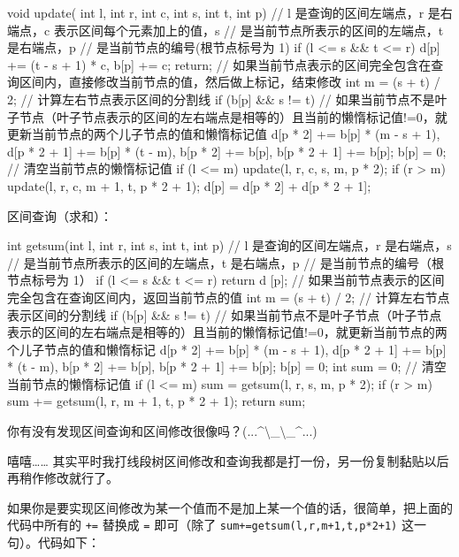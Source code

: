 \begin{cppcode}
void update(
    int l, int r, int c, int s, int t,
    int p)  // l 是查询的区间左端点，r 是右端点，c 表示区间每个元素加上的值，s
            // 是当前节点所表示的区间的左端点，t 是右端点，p
            // 是当前节点的编号(根节点标号为 1)
{
  if (l <= s && t <= r) {
    d[p] += (t - s + 1) * c, b[p] += c;
    return;
  }  // 如果当前节点表示的区间完全包含在查询区间内，直接修改当前节点的值，然后做上标记，结束修改
  int m = (s + t) / 2;  // 计算左右节点表示区间的分割线
  if (b[p] &&
      s !=
          t)  // 如果当前节点不是叶子节点（叶子节点表示的区间的左右端点是相等的）且当前的懒惰标记值!=0，就更新当前节点的两个儿子节点的值和懒惰标记值
    d[p * 2] += b[p] * (m - s + 1), d[p * 2 + 1] += b[p] * (t - m),
        b[p * 2] += b[p], b[p * 2 + 1] += b[p];
  b[p] = 0;  // 清空当前节点的懒惰标记值
  if (l <= m) update(l, r, c, s, m, p * 2);
  if (r > m) update(l, r, c, m + 1, t, p * 2 + 1);
  d[p] = d[p * 2] + d[p * 2 + 1];
}
\end{cppcode}

区间查询（求和）：

\begin{cppcode}
int getsum(int l, int r, int s, int t,
           int p)  // l 是查询的区间左端点，r 是右端点，s
                   // 是当前节点所表示的区间的左端点，t 是右端点，p
                   // 是当前节点的编号（根节点标号为 1）
{
  if (l <= s && t <= r)
    return d
        [p];  // 如果当前节点表示的区间完全包含在查询区间内，返回当前节点的值
  int m = (s + t) / 2;  // 计算左右节点表示区间的分割线
  if (b[p] &&
      s !=
          t)  // 如果当前节点不是叶子节点（叶子节点表示的区间的左右端点是相等的）且当前的懒惰标记值!=0，就更新当前节点的两个儿子节点的值和懒惰标记
    d[p * 2] += b[p] * (m - s + 1), d[p * 2 + 1] += b[p] * (t - m),
        b[p * 2] += b[p], b[p * 2 + 1] += b[p];
  b[p] = 0;
  int sum = 0;  // 清空当前节点的懒惰标记值
  if (l <= m) sum = getsum(l, r, s, m, p * 2);
  if (r > m) sum += getsum(l, r, m + 1, t, p * 2 + 1);
  return sum;
}
\end{cppcode}

你有没有发现区间查询和区间修改很像吗？(...\textasciicircum{}\textbackslash{}\_\textbackslash{}\_\textasciicircum{}...)

嘻嘻…… 其实平时我打线段树区间修改和查询我都是打一份，另一份复制黏贴以后再稍作修改就行了。

如果你是要实现区间修改为某一个值而不是加上某一个值的话，很简单，把上面的代码中所有的 \texttt{+=} 替换成 \texttt{=} 即可（除了 \texttt{sum+=getsum(l,r,m+1,t,p*2+1)} 这一句）。代码如下：

